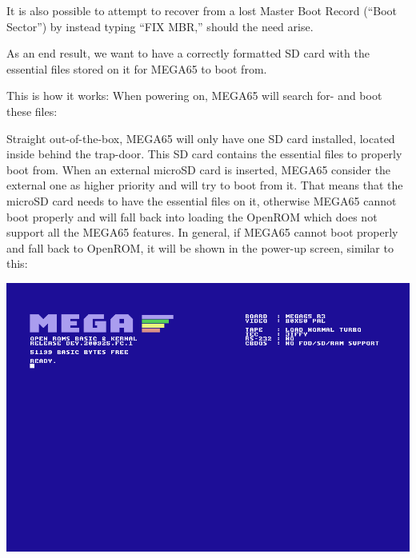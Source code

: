 It is also possible to attempt to recover from a lost Master Boot
Record (``Boot Sector'') by instead typing ``FIX MBR,'' should the
need arise.


As an end result, we want to have a correctly formatted SD card with the essential files stored on it for MEGA65 to boot from.

This is how it works: When powering on, MEGA65 will search for- and boot these files:
\begin{itemize}
\item {\tt FREEZER.M65}
\item {\tt AUDIOMIX.M65}
\item {\tt C64THUMB.M65
\item {\tt C65THUMB.M65
\item {\tt MEGA65.ROM
\item {\tt MEGA65.D81 (default disk image, automatically mounted during start)
\end{itemize}

Straight out-of-the-box, MEGA65 will only have one SD card installed, located inside behind the trap-door. This SD card contains the essential files to properly boot from.
When an external microSD card is inserted, MEGA65 consider the external one as higher priority and will try to boot from it.
That means that the microSD card needs to have the essential files on it, otherwise MEGA65 cannot boot properly and will fall back into loading the OpenROM which does not support all the MEGA65 features.
In general, if MEGA65 cannot boot properly and fall back to OpenROM, it will be shown in the power-up screen, similar to this:

\includegraphics[width=\linewidth]{images/mega65_OpenROM_boot_noSD.png}



